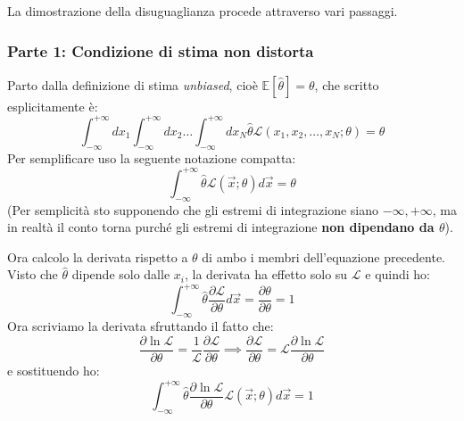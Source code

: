 \documentclass[openany,a4paper,12pt]{book}
\providecommand{\mathscr}[1]{\mathcal{#1}}
\theoremstyle{remark}
\begin{document}
La dimostrazione della disuguaglianza procede attraverso vari passaggi.

\subsubsection*{Parte 1: Condizione di stima non distorta}Parto dalla definizione di stima \textit{unbiased}, cioè $\mathbb{E}[\hat{\theta}] = \theta$, che scritto esplicitamente è:
\begin{equation}
    \int_{-\infty}^{+\infty} dx_1 \int_{-\infty}^{+\infty} dx_2 \dots \int_{-\infty}^{+\infty} dx_N \hat{\theta} \mathscr{L}(x_1, x_2, \dots, x_N; \theta) = \theta
\end{equation}
Per semplificare uso la seguente notazione compatta:
\begin{equation}
    \int_{-\infty}^{+\infty} \hat{\theta} \mathscr{L}(\vec{x}; \theta) d\vec{x} = \theta
\end{equation}
(Per semplicità sto supponendo che gli estremi di integrazione siano $-\infty, +\infty$, ma in realtà il conto torna purché gli estremi di integrazione \textbf{non dipendano da $\theta$}).

Ora calcolo la derivata rispetto a $\theta$ di ambo i membri dell'equazione precedente. Visto che $\hat{\theta}$ dipende solo dalle $x_i$, la derivata ha effetto solo su $\mathscr{L}$ e quindi ho:
\begin{equation}
    \boxed{ \int_{-\infty}^{+\infty} \hat{\theta} \frac{\partial \mathscr{L}}{\partial \theta} d\vec{x} = \frac{\partial \theta}{\partial \theta} = 1 }
\end{equation}
Ora scriviamo la derivata sfruttando il fatto che:
\begin{equation}
    \frac{\partial \ln \mathscr{L}}{\partial \theta} = \frac{1}{\mathscr{L}} \frac{\partial \mathscr{L}}{\partial \theta} \implies \frac{\partial \mathscr{L}}{\partial \theta} = \mathscr{L} \frac{\partial \ln \mathscr{L}}{\partial \theta}
\end{equation}
e sostituendo ho:
\begin{equation}\tag{1}
    \boxed{ \int_{-\infty}^{+\infty} \hat{\theta} \frac{\partial \ln \mathscr{L}}{\partial \theta} \mathscr{L}(\vec{x}; \theta) d\vec{x} = 1 }
\end{equation}
\end{document}
